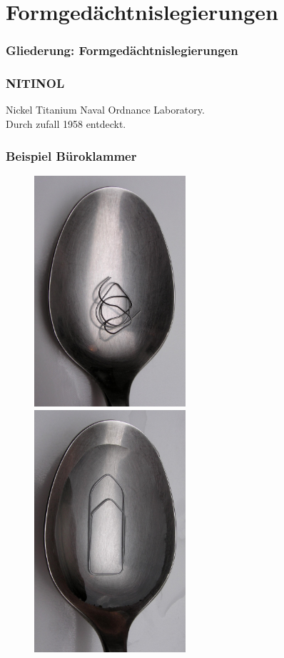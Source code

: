 \section{Formgedächtnislegierungen}

\begin{frame}[t]\frametitle{Gliederung: Formgedächtnislegierungen}
\tableofcontents[
currentsection,
subsectionstyle=show/show/hide
]
\end{frame}

\begin{frame}[c]\frametitle{NITINOL}
	\centering
	Nickel Titanium Naval Ordnance Laboratory.
	\\
	Durch zufall 1958 entdeckt.
\end{frame}


 \label{ergb:01}
 \begin{frame}[c]\frametitle{Beispiel Büroklammer}
	\centering
	\begin{figure}
		\begin{minipage}{0.45\textwidth}
		\includegraphics[width=0.5\textwidth]{medien/Nitinol_bueroklammer_verbogen.jpg}
		\end{minipage}
	\hfill
		\begin{minipage}{0.45\textwidth}
		\includegraphics[width=0.5\textwidth]{medien/Nitinol_bueroklammer_heiss.jpg}

\end{minipage}
\end{figure}
\end{frame}
